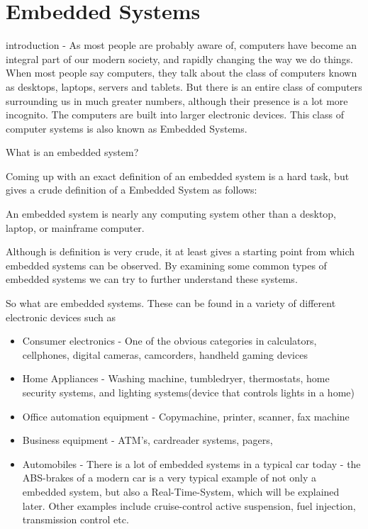 \chapter{Embedded Systems}
introduction - As most people are probably aware of, computers have become an integral part of our modern society,
and rapidly changing the way we do things. When most people say computers, they talk about the class of computers
known as desktops, laptops, servers and tablets. But there is an entire class of computers surrounding us in much greater numbers,
although their presence is a lot more incognito. The computers are built into larger electronic devices.
This class of computer systems is also known as Embedded Systems.

What is an embedded system?

Coming up with an exact definition of an embedded system is a hard task, but \citep{vahid1999embedded} gives a crude
definition of a Embedded System as follows: \nl

An  embedded  system  is  nearly  any computing system other than a desktop, laptop, or  mainframe  computer.

Although is definition is very crude, it at least gives a starting point from which embedded systems can be observed.
By examining some common types of embedded systems we can try to further understand these systems.\nl

So what are embedded systems. These can be found in a variety of different electronic devices such as
\begin{itemize}
\item Consumer electronics - One of the obvious categories in calculators, cellphones, digital cameras, camcorders, handheld gaming devices
\item Home Appliances - Washing machine, tumbledryer, thermostats, home security systems, and lighting systems(device that controls lights in a home)
\item Office automation equipment - Copymachine, printer, scanner, fax machine
\item Business equipment - ATM's, cardreader systems, pagers,
\item Automobiles - There is a lot of embedded systems in a typical car today - the ABS-brakes of a modern car is a very typical
example of not only a embedded system, but also a Real-Time-System, which will be explained later. Other examples include cruise-control
active suspension, fuel injection, transmission control etc.
\end{itemize}
\nl

